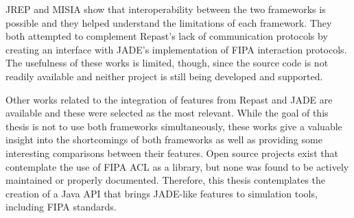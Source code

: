 JREP and MISIA show that interoperability between the two frameworks is possible and they helped understand the limitations of each framework. They both attempted to complement Repast's lack of communication protocols by creating an interface with JADE's implementation of FIPA interaction protocols. The usefulness of these works is limited, though, since the source code is not readily available and neither project is still being developed and supported.

Other works related to the integration of features from Repast and JADE are available and these were selected as the most relevant. While the goal of this thesis is not to use both frameworks simultaneously, these works give a valuable insight into the shortcomings of both frameworks as well as providing some interesting comparisons between their features. Open source projects exist that contemplate the use of FIPA ACL as a library, but none was found to be actively maintained or properly documented. Therefore, this thesis contemplates the creation of a Java API that brings JADE-like features to simulation tools, including FIPA standards.